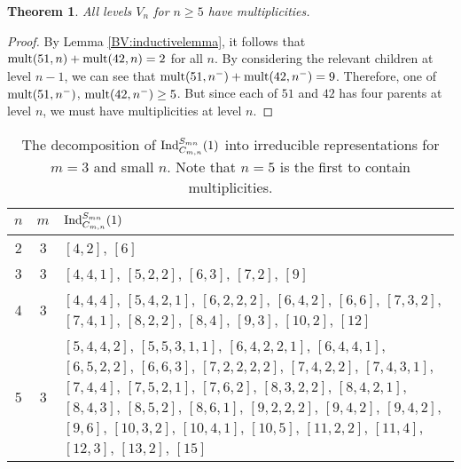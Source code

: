 \documentclass[12pt]{amsart}
\newtheorem{theorem}{Theorem}
\numberwithin{theorem}{section}
\newcommand{\Ind}{\textup{Ind}}
\newcommand{\mult}{\textup{mult}}
\begin{document}
\begin{theorem}\label{BV:multiplicities}
All levels $V_n$ for $n \ge 5$ have multiplicities.
\end{theorem}
\begin{proof}
By Lemma \ref{BV:inductivelemma}, it follows that $\mult(51,n) + \mult(42,n) = 2$ for all $n$.
By considering the relevant children at level $n-1$, we can see that $\mult(51,n^-) + \mult(42,n^-) = 9$.
 Therefore, one of
$\mult(51,n^-)$, $\mult(42,n^-) \ge 5$. But since each of $51$ and $42$ has four parents at
level $n$, we must have multiplicities at level $n$.
\end{proof}

\begin{table}[h]
\caption{The decomposition of $\Ind_{C_{m,n}}^{S_{mn}}(1)$ into irreducible representations for $m=3$ and small $n$. Note that $n=5$ is the first to contain multiplicities.}
\begin{center} 
    \begin{tabular}{|c|c|p{12cm}|}
    \hline
    $n$ & $m$ & $\Ind_{C_{m,n}}^{S_{mn}}(1)$ \\ \hline
    2 & 3 & $[4, 2]$, $[6]$ \\ \hline
    3 & 3 & $[4, 4, 1]$, $[5, 2, 2]$, $[6, 3]$, $[7, 2]$, $[9]$  \\ \hline
    4 & 3 & $[4, 4, 4]$, $[5, 4, 2, 1]$, $[6, 2, 2, 2]$, $[6, 4, 2]$, $[6, 6]$, $[7, 3, 2]$, $[7, 4, 1]$, $[8, 2, 2]$, $[8, 4]$, $[9, 3]$, $[10, 2]$, $[12]$ \\ \hline
    5 & 3 & $[5, 4, 4, 2]$, $[5, 5, 3, 1, 1]$, $[6, 4, 2, 2, 1]$, $[6, 4, 4, 1]$, $[6, 5, 2, 2]$, $[6, 6, 3]$, $[7, 2, 2, 2, 2]$, $[7, 4, 2, 2]$, $[7, 4, 3, 1]$, $[7, 4, 4]$, $[7, 5, 2, 1]$, $[7, 6, 2]$, $[8, 3, 2, 2]$, $[8, 4, 2, 1]$, $[8, 4, 3]$, $[8, 5, 2]$, $[8, 6, 1]$, $[9, 2, 2, 2]$, $[9, 4, 2]$, $[9, 4, 2]$, $[9, 6]$, $[10, 3, 2]$, $[10, 4, 1]$, $[10, 5]$, $[11, 2, 2]$, $[11, 4]$, $[12, 3]$, $[13, 2]$, $[15]$ \\ \hline
    \end{tabular}
\label{BV:table1}
\end{center}
\end{table}




\end{document}
